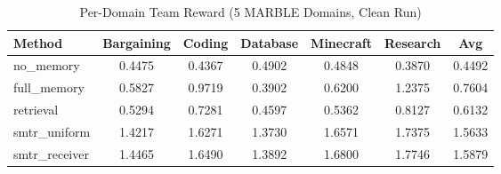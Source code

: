 \begin{table}[t]
\caption{Per-Domain Team Reward (5 MARBLE Domains, Clean Run)}
\label{tab:final_receiver3_per_domain}
\centering
\begin{tabular}{l c c c c c c}
\toprule
Method & Bargaining & Coding & Database & Minecraft & Research & Avg \\
\midrule
no\_memory & 0.4475 & 0.4367 & 0.4902 & 0.4848 & 0.3870 & 0.4492 \\
full\_memory & 0.5827 & 0.9719 & 0.3902 & 0.6200 & 1.2375 & 0.7604 \\
retrieval & 0.5294 & 0.7281 & 0.4597 & 0.5362 & 0.8127 & 0.6132 \\
smtr\_uniform & 1.4217 & 1.6271 & 1.3730 & 1.6571 & 1.7375 & 1.5633 \\
smtr\_receiver & 1.4465 & 1.6490 & 1.3892 & 1.6800 & 1.7746 & 1.5879 \\
\bottomrule
\end{tabular}
\end{table}
